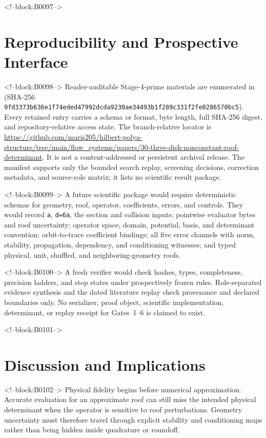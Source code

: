 \documentclass[11pt,a4paper]{article}
\begin{document}
<!--block:B0097-->
\section{Reproducibility and Prospective Interface}

<!--block:B0098-->
Reader-auditable Stage-4-prime materials are enumerated in
 (SHA-256
\texttt{9fd3373b636e1f74eded47992dcda9230ae34493b1f289c331f2fe0286570bc5}).  Every retained entry carries a schema or format,
byte length, full SHA-256 digest, and repository-relative access state.  The
branch-relative locator is
\url{https://github.com/maris205/hilbert-polya-structure/tree/main/flow_systems/papers/30-three-disk-nonconstant-roof-determinant}.
It is not a content-addressed or persistent archival release.  The manifest
supports only the bounded search replay, screening decisions, correction
metadata, and source-role matrix; it lists no scientific result package.

<!--block:B0099-->
A future scientific package would require deterministic schemas for geometry, roof, operator, coefficients, errors, and controls. They would record \texttt{a}, \texttt{d=6a}, the section and collision inputs; pointwise evaluator bytes and roof uncertainty; operator space, domain, potential, basis, and determinant convention; orbit-to-trace coefficient bindings; all five error channels with norm, stability, propagation, dependency, and conditioning witnesses; and typed physical, unit, shuffled, and neighboring-geometry roofs.

<!--block:B0100-->
A fresh verifier would check hashes, types, completeness, precision ladders,
and stop states under prospectively frozen rules.  Role-separated evidence
synthesis and the dated literature replay check provenance and declared
boundaries only.  No serializer, proof object, scientific implementation,
determinant, or replay receipt for Gates~1--6 is claimed to exist.

<!--block:B0101-->
\section{Discussion and Implications}

<!--block:B0102-->
Physical fidelity begins before numerical approximation. Accurate evaluation for an approximate roof can still miss the intended physical determinant when the operator is sensitive to roof perturbations. Geometry uncertainty must therefore travel through explicit stability and conditioning maps rather than being hidden inside quadrature or roundoff.
\end{document}
